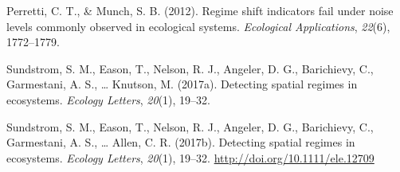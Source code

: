 \documentclass[12pt,twoside,openany]{reedthesis}
\begin{document}
\hypertarget{ref-perretti2012regime}{}
Perretti, C. T., \& Munch, S. B. (2012). Regime shift indicators fail
under noise levels commonly observed in ecological systems.
\emph{Ecological Applications}, \emph{22}(6), 1772--1779.

\hypertarget{ref-sundstrom_detecting_2017}{}
Sundstrom, S. M., Eason, T., Nelson, R. J., Angeler, D. G., Barichievy,
C., Garmestani, A. S., \ldots{} Knutson, M. (2017a). Detecting spatial
regimes in ecosystems. \emph{Ecology Letters}, \emph{20}(1), 19--32.

\hypertarget{ref-sundstrom2017detecting}{}
Sundstrom, S. M., Eason, T., Nelson, R. J., Angeler, D. G., Barichievy,
C., Garmestani, A. S., \ldots{} Allen, C. R. (2017b). Detecting spatial
regimes in ecosystems. \emph{Ecology Letters}, \emph{20}(1), 19--32.
\url{http://doi.org/10.1111/ele.12709}
\end{document}
